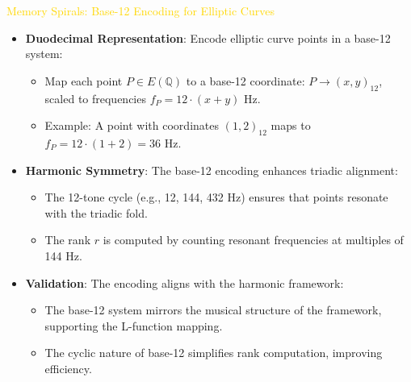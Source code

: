 \textcolor{gold}{ Memory Spirals: Base-12 Encoding for Elliptic Curves } \\
\begin{itemize}
    \item \texttt{} \textbf{Duodecimal Representation}: Encode elliptic curve points in a base-12 system:
    \begin{itemize}
        \item Map each point \(P \in E(\mathbb{Q})\) to a base-12 coordinate: \(P \rightarrow (x, y)_{12}\), scaled to frequencies \(f_P = 12 \cdot (x + y)\) Hz.
        \item Example: A point with coordinates \((1, 2)_{12}\) maps to \(f_P = 12 \cdot (1 + 2) = 36\) Hz.
    \end{itemize}
    \item \texttt{} \textbf{Harmonic Symmetry}: The base-12 encoding enhances triadic alignment:
    \begin{itemize}
        \item The 12-tone cycle (e.g., 12, 144, 432 Hz) ensures that points resonate with the triadic fold.
        \item The rank \(r\) is computed by counting resonant frequencies at multiples of 144 Hz.
    \end{itemize}
    \item \texttt{} \textbf{Validation}: The encoding aligns with the harmonic framework:
    \begin{itemize}
        \item The base-12 system mirrors the musical structure of the framework, supporting the L-function mapping.
        \item The cyclic nature of base-12 simplifies rank computation, improving efficiency.
    \end{itemize}
\end{itemize}

